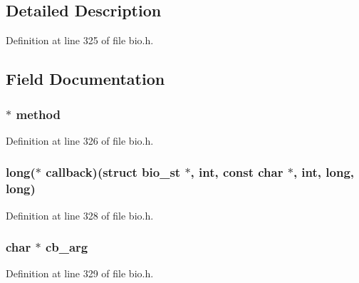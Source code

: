 \subsection{Detailed Description}


Definition at line 325 of file bio.\+h.



\subsection{Field Documentation}
\subsubsection[{\texorpdfstring{method}{method}}]{ $\ast$ method}\hypertarget{structbio__st_afca6f07f18be333bc800f424875b0bdb}{}\label{structbio__st_afca6f07f18be333bc800f424875b0bdb}


Definition at line 326 of file bio.\+h.

\subsubsection[{\texorpdfstring{callback}{callback}}]{\setlength{\rightskip}{0pt plus 5cm}long($\ast$ callback)(struct {\bf bio\+\_\+st} $\ast$, int, const char $\ast$, int, long, long)}\hypertarget{structbio__st_a4baeb597d07b933d0d4212ceb2caef04}{}\label{structbio__st_a4baeb597d07b933d0d4212ceb2caef04}


Definition at line 328 of file bio.\+h.

\subsubsection[{\texorpdfstring{cb\+\_\+arg}{cb_arg}}]{\setlength{\rightskip}{0pt plus 5cm}char $\ast$ cb\+\_\+arg}\hypertarget{structbio__st_a95d787f037e2fc4bbbcdfe2fc658f2fe}{}\label{structbio__st_a95d787f037e2fc4bbbcdfe2fc658f2fe}


Definition at line 329 of file bio.\+h.

